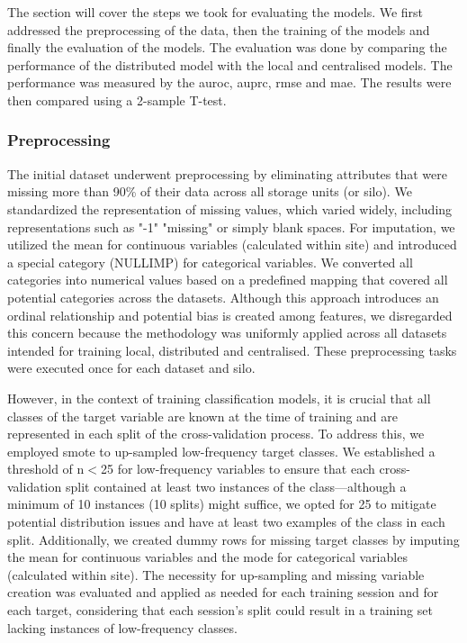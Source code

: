 
The section will cover the steps we took for evaluating the models. We first addressed the preprocessing of the data, then the training of the models and finally the evaluation of the models. The evaluation was done by comparing the performance of the distributed model with the local and centralised models. The performance was measured by the \ac{auroc}, \ac{auprc}, \ac{rmse} and \ac{mae}. The results were then compared using a 2-sample T-test.
\subsubsection{Preprocessing}

The initial dataset underwent preprocessing by eliminating attributes that were missing more than 90\% of their data across all storage units (or silo). We standardized the representation of missing values, which varied widely, including representations such as "-1" "missing" or simply blank spaces. For imputation, we utilized the mean for continuous variables (calculated within site) and introduced a special category (NULLIMP) for categorical variables. We converted all categories into numerical values based on a predefined mapping that covered all potential categories across the datasets. Although this approach introduces an ordinal relationship and potential bias is created among features, we disregarded this concern because the methodology was uniformly applied across all datasets intended for training local, distributed and centralised. These preprocessing tasks were executed once for each dataset and silo.

However, in the context of training classification models, it is crucial that all classes of the target variable are known at the time of training and are represented in each split of the cross-validation process. To address this, we employed \ac{smote} \cite{smote} to up-sampled low-frequency target classes. We established a threshold of n$<$25 for low-frequency variables to ensure that each cross-validation split contained at least two instances of the class—although a minimum of 10 instances (10 splits) might suffice, we opted for 25 to mitigate potential distribution issues and have at least two examples of the class in each split. Additionally, we created dummy rows for missing target classes by imputing the mean for continuous variables and the mode for categorical variables (calculated within site). The necessity for up-sampling and missing variable creation was evaluated and applied as needed for each training session and for each target, considering that each session's split could result in a training set lacking instances of low-frequency classes.

